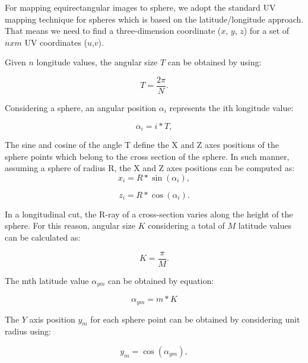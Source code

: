 \documentclass[10pt,conference]{IEEEtran}
\begin{document}
For mapping equirectangular images to sphere, we adopt the standard UV mapping technique for spheres which is based on the latitude/longitude approach. That means we need to find a three-dimension coordinate ($x$, $y$, $z$) for a set of $n x m$ UV coordinates ($u$,$v$).

Given $n$ longitude values, the angular size $T$ can be obtained by using:

\begin{equation}
T = \frac{2 \pi}{N}.
\label{longitudesize}
\end{equation}

Considering a sphere, an angular position $\alpha_{i}$ represents the ith longitude value:

\begin{equation}
\alpha_{i} = i * T,
\label{longitudealpha}
\end{equation}

The sine and cosine of the angle T define the X and Z axes positions of the sphere points which belong to the cross section of the sphere. In such manner, assuming a sphere of radius R, the X and Z axes positions can be computed as:
\begin{equation}
x_{i} = R * \sin(\alpha_{i}),
\label{x_d}
\end{equation}

\begin{equation}
z_{i} = R * \cos(\alpha_{i}).
\label{z_d}
\end{equation}

In a longitudinal cut, the R-ray of a cross-section varies along the height of the sphere. For this reason, angular size $K$ considering a total of $M$ latitude values can be calculated as:

\begin{equation}
K = \frac{\pi}{M}.
\label{equation5}
\end{equation}

The mth latitude value $\alpha_{ym}$ can be obtained by equation:

\begin{equation}
\alpha_{ym} = m * K
\label{equation6}
\end{equation}

The $Y$ axis position $y_{m}$ for each sphere point can be obtained by considering unit radius using:

\begin{equation}
y_{m} = \cos(\alpha_{ym}),
\label{equation7}
\end{equation}
\end{document}
